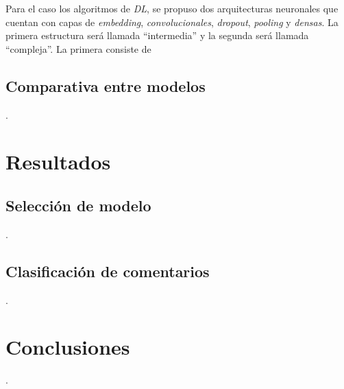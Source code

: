 Para el caso los algoritmos de \textit{DL}, se propuso dos arquitecturas neuronales que cuentan con capas de \textit{embedding}, \textit{convolucionales}, \textit{dropout}, \textit{pooling} y \textit{densas}. La primera estructura será llamada “intermedia” y la segunda será llamada “compleja”. La primera consiste de 


\subsection{Comparativa entre modelos}
.

\section{Resultados}
\subsection{Selección de modelo}
.
\subsection{Clasificación de comentarios}
.

\section{Conclusiones}
.



\newpage
	




